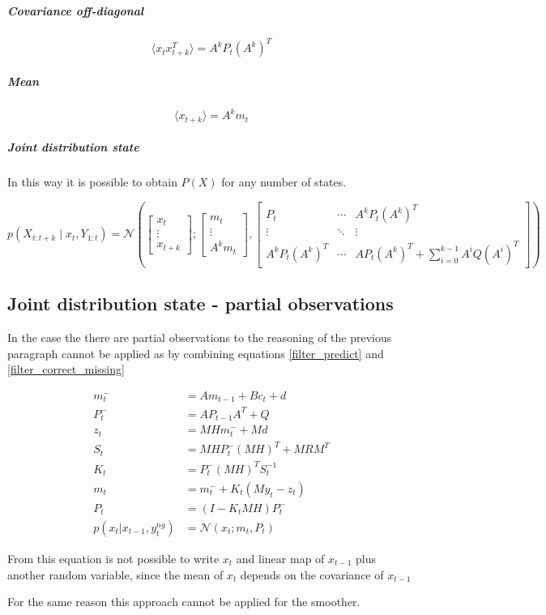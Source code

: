 \documentclass{article}
\newcommand{\E}[1]{\langle #1 \rangle} %
\newcommand{\norm}[3]{\mathcal{N}\left(#1; #2, #3\right)}
\begin{document}
\subparagraph{Covariance off-diagonal}

\begin{equation}
    \E{x_tx_{t+k}^T} = A^kP_t(A^k)^T
\end{equation}

\subparagraph{Mean}

\begin{equation}
    \E{x_{t+k}} = A^km_t
\end{equation}

\subparagraph{Joint distribution state}
In this way it is possible to obtain $P(X)$ for any number of states.

\begin{equation}\label{p_X_final}
p(X_{t:t+k}\mid x_t, Y_{1:t}) = \norm{\begin{bmatrix}x_t\\\vdots\\x_{t+k}\end{bmatrix}}
    {\begin{bmatrix}m_t\\\vdots\\A^km_t\end{bmatrix}}
    {\begin{bmatrix}P_t & \cdots & A^kP_t(A^k)^T\\ \vdots & \ddots & \vdots \\A^kP_t(A^k)^T & \cdots & AP_t(A^k)^T + \sum_{i=0}^{k-1} A^iQ(A^i)^T\end{bmatrix}}
\end{equation}

\subsection{Joint distribution state - partial observations}

In the case the there are partial observations to the reasoning of the previous paragraph cannot be applied as by combining equations \ref{filter_predict} and \ref{filter_correct_missing}

\begin{equation}\label{filter_combined}
\begin{split}
    m_t^- &= Am_{t-1} + B c_t + d\\
    P_t^- &= AP_{t-1}A^T + Q\\
    z_t &= MHm_t^- + Md\\
    S_t &= MHP_t^-(MH)^T + MRM^T\\
    K_t &= P_t^-(MH)^TS_t^{-1}\\
    m_t &= m_t^- + K_t(My_t - z_t)\\
    P_t &= (I-K_tMH)P_t^-\\
    p(x_t|x_{t-1}, y^{ng}_t) &= \mathcal{N}(x_t; m_t, P_t)
\end{split}
\end{equation}

From this equation is not possible to write $x_t$ and linear map of $x_{t-1}$ plus another random variable, since the mean of $x_t$ depends on the covariance of $x_{t-1}$ 
    
For the same reason this approach cannot be applied for the smoother.
\end{document}
